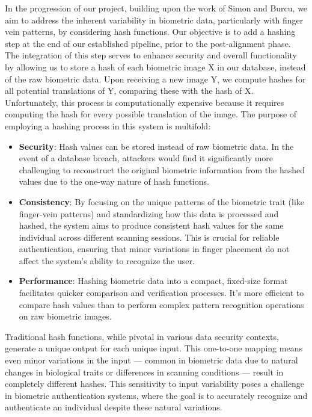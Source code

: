 In the progression of our project, building upon the work of Simon and Burcu, we aim to address the inherent variability in biometric data, particularly with finger vein patterns, by considering hash functions. Our objective is to add a hashing step at the end of our established pipeline, prior to the post-alignment phase. The integration of this step serves to enhance security and overall functionality by allowing us to store a hash of each biometric image X in our database, instead of the raw biometric data. Upon receiving a new image Y, we compute hashes for all potential translations of Y, comparing these with the hash of X. Unfortunately, this process is computationally expensive because it requires computing the hash for every possible translation of the image. The purpose of employing a hashing process in this system is multifold:

\begin{itemize}
    \item \textbf{Security}: Hash values can be stored instead of raw biometric data. In the event of a database breach, attackers would find it significantly more challenging to reconstruct the original biometric information from the hashed values due to the one-way nature of hash functions.

    \item \textbf{Consistency}: By focusing on the unique patterns of the biometric trait (like finger-vein patterns) and standardizing how this data is processed and hashed, the system aims to produce consistent hash values for the same individual across different scanning sessions. This is crucial for reliable authentication, ensuring that minor variations in finger placement do not affect the system's ability to recognize the user.

    \item \textbf{Performance}: Hashing biometric data into a compact, fixed-size format facilitates quicker comparison and verification processes. It's more efficient to compare hash values than to perform complex pattern recognition operations on raw biometric images.
\end{itemize}

Traditional hash functions, while pivotal in various data security contexts, generate a unique output for each unique input. This one-to-one mapping means even minor variations in the input — common in biometric data due to natural changes in biological traits or differences in scanning conditions — result in completely different hashes. This sensitivity to input variability poses a challenge in biometric authentication systems, where the goal is to accurately recognize and authenticate an individual despite these natural variations.

